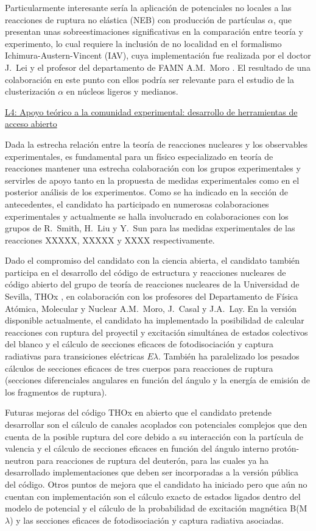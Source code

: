 \documentclass[a4paper,12pt,twoside]{article}
\begin{document}
Particularmente interesante sería la aplicación de potenciales no locales a las reacciones de ruptura no elástica (NEB) \cite{neb} con producción de partículas $\alpha$, que presentan unas sobreestimaciones significativas en la comparación entre teoría y experimento, lo cual requiere la inclusión de no localidad en el formalismo Ichimura-Austern-Vincent (IAV), cuya implementación fue realizada por el doctor J.~Lei y el profesor del departamento de FAMN A.M.~Moro \cite{iav}. El resultado de una colaboración en este punto con ellos podría ser relevante para el estudio de la clusterización $\alpha$ en núcleos ligeros y medianos.

\underline{L4: Apoyo teórico a la comunidad experimental:  desarrollo de herramientas de acceso abierto}

Dada la estrecha relación entre la teoría de reacciones nucleares y los observables experimentales, es fundamental para un físico especializado en teoría de reacciones mantener una estrecha colaboración con los grupos experimentales y servirles de apoyo tanto en la propuesta de medidas experimentales como en el posterior análisis de los experimentos. Como se ha indicado en la sección de antecedentes, el candidato ha participado en numerosas colaboraciones experimentales y actualmente se halla involucrado en colaboraciones con los grupos de R.~Smith, H.~Liu y Y.~Sun para las medidas experimentales de las reacciones XXXXX, XXXXX y XXXX respectivamente.

Dado el compromiso del candidato con la ciencia abierta, el candidato también participa en el desarrollo del código de estructura y reacciones nucleares de código abierto del grupo de teoría de reacciones nucleares de la Universidad de Sevilla, THOx \cite{thox}, en colaboración con los profesores del Departamento de Física Atómica, Molecular y Nuclear A.M.~Moro, J.~Casal y J.A.~Lay. En la versión disponible actualmente, el candidato ha implementado la posibilidad de calcular reacciones con ruptura del proyectil y excitación simultánea de estados colectivos del blanco \cite{target_exc} y el cálculo de secciones eficaces de fotodisociación y captura radiativas para transiciones eléctricas $E\lambda$. También ha paralelizado los pesados cálculos de secciones eficaces de tres cuerpos para reacciones de ruptura (secciones diferenciales angulares en función del ángulo y la energía de emisión de los fragmentos de ruptura).

Futuras mejoras del código THOx en abierto que el candidato pretende desarrollar son el cálculo de canales acoplados con potenciales complejos que den cuenta de la posible ruptura del core debido a su interacción con la partícula de valencia \cite{complex_cdcc} y el cálculo de secciones eficaces en función del ángulo interno protón-neutron para reacciones de ruptura del deuterón, para las cuales ya ha desarrollado implementaciones que deben ser incorporadas a la versión pública del código. Otros puntos de mejora que el candidato ha iniciado pero que aún no cuentan con implementación son el cálculo exacto de estados ligados dentro del modelo de potencial y el cálculo de la probabilidad de excitación magnética B(M$\lambda$) y las secciones eficaces de fotodisociación y captura radiativa asociadas.
\end{document}
